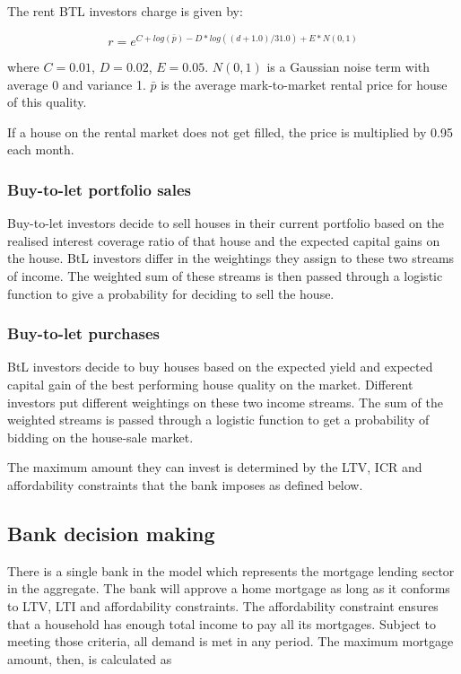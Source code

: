\documentclass{article}
\begin{document}
The rent BTL investors charge is given by:

\begin{equation}
r=e^{C+log(\bar{p})-D\ast log((d+1.0)/31.0)+E\ast N(0,1)}
\end{equation}

\bigskip

where $C=0.01$, $D=0.02$, $E=0.05$. $N(0,1)$ is a Gaussian noise term with
average 0 and variance 1. $\bar{p}$ is the average mark-to-market rental
price for house of this quality.

If a house on the rental market does not get filled, the price is multiplied by 0.95 each month.

\subsubsection{Buy-to-let portfolio sales}

Buy-to-let investors decide to sell houses in their current portfolio based
on the realised interest coverage ratio of that house and the expected
capital gains on the house. BtL investors differ in the weightings they
assign to these two streams of income. The weighted sum of these streams is
then passed through a logistic function to give a probability for deciding
to sell the house.


\subsubsection{Buy-to-let purchases}

BtL investors decide to buy houses based on the expected yield and expected
capital gain of the best performing house quality on the market. Different
investors put different weightings on these two income streams. The sum of
the weighted streams is passed through a logistic function to get a
probability of bidding on the house-sale market.

The maximum amount they can invest is determined by the LTV, ICR and
affordability constraints that the bank imposes as defined below.

\subsection{Bank decision making}

There is a single bank in the model which represents the mortgage lending
sector in the aggregate. The bank will approve a home mortgage as long as it
conforms to LTV, LTI and affordability constraints. The affordability
constraint ensures that a household has enough total income to pay all its
mortgages. Subject to meeting those criteria, all demand is met in any
period. The maximum mortgage amount, then, is calculated as
\end{document}
